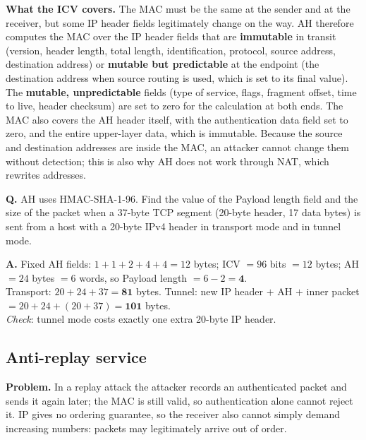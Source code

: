 \textbf{What the ICV covers.} The MAC must be the same at the sender and at the receiver, but some IP header fields legitimately change on the way. AH therefore computes the MAC over the IP header fields that are \textbf{immutable} in transit (version, header length, total length, identification, protocol, source address, destination address) or \textbf{mutable but predictable} at the endpoint (the destination address when source routing is used, which is set to its final value). The \textbf{mutable, unpredictable} fields (type of service, flags, fragment offset, time to live, header checksum) are set to zero for the calculation at both ends. The MAC also covers the AH header itself, with the authentication data field set to zero, and the entire upper-layer data, which is immutable. Because the source and destination addresses are inside the MAC, an attacker cannot change them without detection; this is also why AH does not work through NAT, which rewrites addresses.

\begin{worked}
\textbf{Q.} AH uses HMAC-SHA-1-96. Find the value of the Payload length field and the size of the packet when a 37-byte TCP segment (20-byte header, 17 data bytes) is sent from a host with a 20-byte IPv4 header in transport mode and in tunnel mode.

\textbf{A.} Fixed AH fields: $1 + 1 + 2 + 4 + 4 = 12$ bytes; ICV $= 96$ bits $= 12$ bytes; AH $= 24$ bytes $= 6$ words, so Payload length $= 6 - 2 = \mathbf{4}$.\\
Transport: $20 + 24 + 37 = \mathbf{81}$ bytes. Tunnel: new IP header $+$ AH $+$ inner packet $= 20 + 24 + (20 + 37) = \mathbf{101}$ bytes.\\
\emph{Check}: tunnel mode costs exactly one extra 20-byte IP header.
\end{worked}

\subsection{Anti-replay service \new}

\textbf{Problem.} In a replay attack the attacker records an authenticated packet and sends it again later; the MAC is still valid, so authentication alone cannot reject it. IP gives no ordering guarantee, so the receiver also cannot simply demand increasing numbers: packets may legitimately arrive out of order.

